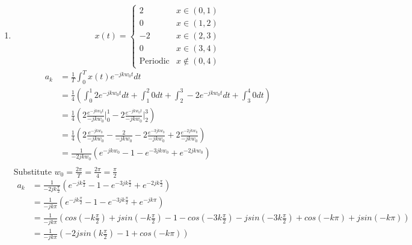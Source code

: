 \documentclass[10pt,a4paper, margin=1in]{article}
\begin{document}
\begin{enumerate}
\item
\[ x(t) = \begin{cases}
        2 & x \in (0, 1) \\
        0 & x \in (1, 2) \\
        -2 & x \in (2, 3) \\
        0 & x \in (3, 4) \\
        \text{Periodic} & x \notin (0, 4)
\end{cases}\]
\begin{align*}
    a_k &= \frac{1}{T} \int_{0}^{T} x(t) e^{-jkw_0t} dt \\
    &= \frac{1}{4} (\int_{0}^{1} 2e^{-jkw_0t} dt + \int_{1}^{2} 0 dt + \int_{2}^{3} -2 e^{-jkw_0t} dt + \int_{3}^{4} 0 dt) \\
    &= \frac{1}{4} (2\frac{e^{-jkw_0t}}{-jkw_0} \Big|_{0}^{1} - 2\frac{e^{-jkw_0t}}{-jkw_0} \Big|_{2}^{3}) \\
    &= \frac{1}{4} (2\frac{e^{-jkw_0}}{-jkw_0} - \frac{2}{-jkw_0} - 2\frac{e^{-3jkw_0}}{-jkw_0} + 2\frac{e^{-2jkw_0}}{-jkw_0}) \\
    &= \frac{1}{-2jkw_0} (e^{-jkw_0} - 1 - e^{-3jkw_0} + e^{-2jkw_0}) \\
\end{align*}
Substitute $w_0 = \frac{2\pi}{T} = \frac{2\pi}{4} = \frac{\pi}{2}$\\

\begin{align*}
    a_k &= \frac{1}{-2jk\frac{\pi}{2}} (e^{-jk\frac{\pi}{2}} - 1 - e^{-3jk\frac{\pi}{2}} + e^{-2jk\frac{\pi}{2}}) \\
    &= \frac{1}{-jk\pi} (e^{-jk\frac{\pi}{2}} - 1 - e^{-3jk\frac{\pi}{2}} + e^{-jk\pi}) \\
    &= \frac{1}{-jk\pi} (cos(-k\frac{\pi}{2}) + jsin(-k\frac{\pi}{2}) - 1 - cos(-3k\frac{\pi}{2}) - jsin(-3k\frac{\pi}{2}) + cos(-k\pi) + jsin(-k\pi)) \\
    &= \frac{1}{-jk\pi} (-2jsin(k\frac{\pi}{2}) - 1 + cos(-k\pi)) \\
\end{align*}



\end{enumerate}
\end{document}
